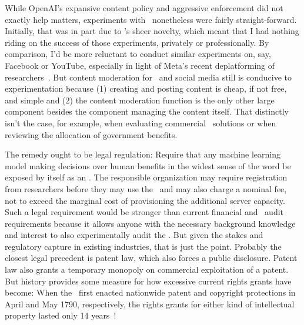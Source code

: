 While OpenAI's expansive content policy and aggressive enforcement did not
exactly help matters, experiments with \DALLE\ nonetheless were fairly
straight-forward. Initially, that was in part due to \DALLE's sheer novelty,
which meant that I had nothing riding on the success of those experiments,
privately or professionally. By comparison, I'd be more reluctant to conduct
similar experiments on, say, Facebook or YouTube, especially in light of Meta's
recent deplatforming of researchers~\cite{EdelsonMcCoy2021a}. But content
moderation for \DALLE\ and social media still is conducive to experimentation
because (1) creating and posting content is cheap, if not free, and simple and
(2) the content moderation function is the only other large component besides
the component managing the content itself. That distinctly isn't the case, for
example, when evaluating commercial \AI\ solutions or when reviewing the
allocation of government benefits.

The remedy ought to be legal regulation: Require that any machine learning model
making decisions over human benefits in the widest sense of the word be exposed
by itself as an \API. The responsible organization may require registration from
researchers before they may use the \API\ and may also charge a nominal fee, not
to exceed the marginal cost of provisioning the additional server capacity. Such
a legal requirement would be stronger than current financial and \DSA\ audit
requirements because it allows anyone with the necessary background knowledge
and interest to also experimentally audit the \AI. But given the stakes and
regulatory capture in existing industries, that is just the point. Probably the
closest legal precedent is patent law, which also forces a public disclosure.
Patent law also grants a temporary monopoly on commercial exploitation of a
patent. But history provides some measure for how excessive current rights
grants have become: When the \US\ first enacted nationwide patent and copyright
protections in April and May 1790, respectively, the rights grants for either
kind of intellectual property lasted only 14
years~\cite{FisherIII1999,KhanSokoloff2001}!
